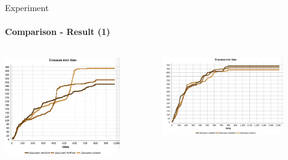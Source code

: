 \documentclass{beamer}
\begin{document}
\begin{frame}[fragile]{Experiment}
\framesubtitle{Comparison - Result (1)}

\begin{columns}
\begin{column}{0.5\textwidth}
\includegraphics[width=0.8\textwidth]{img/3-Simulation-500people.png}
\end{column}

\begin{column}{0.5\textwidth}
\includegraphics[width=0.8\textwidth]{img/3-Simulation-1000people.png}
\end{column}

\end{columns}

\end{frame}
\end{document}
